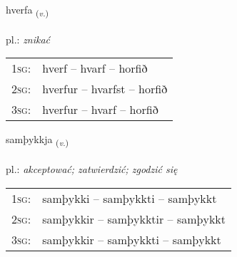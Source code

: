 \documentclass[frontgrid, backgrid]{flacards}\usepackage[]{graphicx}\usepackage[]{xcolor}
\begin{document}
\renewcommand{\blhead}{\vskip5pt {\small\bfseries\footnotesize Sagnorð | Verb }}
\renewcommand{\bcfoot}{\vskip5pt \hspace{2pt}{\small\bfseries\footnotesize 1K}}


{hverfa \small{\textsubscript{(\textit{v.})}} \\[1ex] %
\textphonetic{[kʰvɛrva]} \\
pl.: \emph{znikać} \\  [2ex]
\renewcommand*{\arraystretch}{0.8}
\begin{tabular}{p{1cm}l}
\textsc{1sg}: & hverf -- hvarf -- horfið \\ 
\textsc{2sg}: & hverfur -- hvarfst -- horfið \\ 
\textsc{3sg}: & hverfur -- hvarf -- horfið \\ 
\end{tabular}
}

\renewcommand{\flhead}{\vskip5pt \fboxsep=0pt {\small\bfseries\footnotesize Sagnorð | Verb}}
\renewcommand{\fcfoot}{\vskip5pt \fboxsep=0pt \hspace{2pt}{\small\bfseries\footnotesize 1K}}

\renewcommand{\blhead}{\vskip5pt {\small\bfseries\footnotesize Sagnorð | Verb }}
\renewcommand{\bcfoot}{\vskip5pt \hspace{2pt}{\small\bfseries\footnotesize 1K}}


{samþykkja \small{\textsubscript{(\textit{v.})}} \\[1ex] %
\textphonetic{[samθɪhca]} \\
pl.: \emph{akceptować; zatwierdzić; zgodzić się} \\  [2ex]
\renewcommand*{\arraystretch}{0.8}
\begin{tabular}{p{1cm}l}
\textsc{1sg}: & samþykki -- samþykkti -- samþykkt \\ 
\textsc{2sg}: & samþykkir -- samþykktir -- samþykkt \\ 
\textsc{3sg}: & samþykkir -- samþykkti -- samþykkt \\ 
\end{tabular}
}
\end{document}
